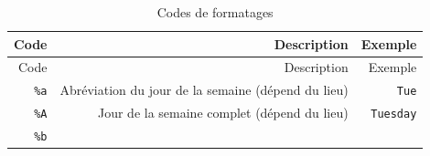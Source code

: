 \documentclass[12pt,]{book}
\numberwithin{equation}{section}
\numberwithin{countremarque}{section}
\begin{document}
\begin{longtable}[]{@{}rrr@{}}
\caption{\label{tab:codes-formatage} Codes de formatages}\tabularnewline
\toprule
\begin{minipage}[b]{0.10\columnwidth}\raggedleft\strut
Code\strut
\end{minipage} & \begin{minipage}[b]{0.60\columnwidth}\raggedleft\strut
Description\strut
\end{minipage} & \begin{minipage}[b]{0.22\columnwidth}\raggedleft\strut
Exemple\strut
\end{minipage}\tabularnewline
\midrule
\endfirsthead
\toprule
\begin{minipage}[b]{0.10\columnwidth}\raggedleft\strut
Code\strut
\end{minipage} & \begin{minipage}[b]{0.60\columnwidth}\raggedleft\strut
Description\strut
\end{minipage} & \begin{minipage}[b]{0.22\columnwidth}\raggedleft\strut
Exemple\strut
\end{minipage}\tabularnewline
\midrule
\endhead
\begin{minipage}[t]{0.10\columnwidth}\raggedleft\strut
\texttt{\%a}\strut
\end{minipage} & \begin{minipage}[t]{0.60\columnwidth}\raggedleft\strut
Abréviation du jour de la semaine (dépend du lieu)\strut
\end{minipage} & \begin{minipage}[t]{0.22\columnwidth}\raggedleft\strut
\texttt{Tue}\strut
\end{minipage}\tabularnewline
\begin{minipage}[t]{0.10\columnwidth}\raggedleft\strut
\texttt{\%A}\strut
\end{minipage} & \begin{minipage}[t]{0.60\columnwidth}\raggedleft\strut
Jour de la semaine complet (dépend du lieu)\strut
\end{minipage} & \begin{minipage}[t]{0.22\columnwidth}\raggedleft\strut
\texttt{Tuesday}\strut
\end{minipage}\tabularnewline
\begin{minipage}[t]{0.10\columnwidth}\raggedleft\strut
\texttt{\%b}\strut
\end{minipage} & \begin{minipage}[t]{0.60\columnwidth}\raggedleft\strut

\end{minipage}
\end{longtable}
\end{document}
